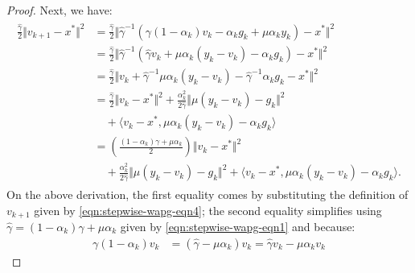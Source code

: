 \documentclass[12pt]{article}
\begin{document}
\begin{proof}
        Next, we have: 
        \begin{align}
        \label{eqn:stepwise-lya-proof-eqn2}
        \begin{split}
            \frac{\hat \gamma}{2}\Vert v_{k + 1} - x^* \Vert^2
            &= 
            \frac{\hat \gamma}{2}\Vert 
                \hat \gamma^{-1}
                (
                    \gamma(1 - \alpha_k)v_k - 
                    \alpha_k g_k + \mu \alpha_k y_k
                )
                - x^* 
            \Vert^2
            \\
            &=  
            \frac{\hat \gamma}{2}
            \Vert 
                \hat \gamma^{-1}
                (
                \hat \gamma v_k + \mu \alpha_k(y_k - v_k)
                    - \alpha_k g_k
                )
                - x^* 
            \Vert^2
            \\
            &= 
            \frac{\hat \gamma}{2}
            \Vert 
                v_k + \hat \gamma^{-1} \mu \alpha_k (y_k - v_k)
                - \hat \gamma^{-1}\alpha_k g_k
                - x^* 
            \Vert^2
            \\
            &= 
            \frac{\hat \gamma}{2}
            \Vert v_k - x^*\Vert^2 
            + 
            \frac{\alpha_k^2}{2\hat \gamma}\Vert \mu(y_k - v_k) - g_k\Vert^2 
            \\ &\quad 
                + 
                \langle v_k - x^*, \mu \alpha_k(y_k - v_k) - \alpha_k g_k\rangle
            \\
            &= 
            \left(
            \frac{(1 - \alpha_k)\gamma + \mu \alpha_k}{2} 
            \right)\Vert v_k - x^*\Vert^2
            \\ &\quad
                + 
                \frac{\alpha_k^2}{2\hat \gamma}
                \Vert \mu(y_k - v_k) - g_k\Vert^2 
                + 
                \langle v_k - x^*, \mu \alpha_k(y_k - v_k) - \alpha_k g_k\rangle. 
        \end{split}
        \end{align}
        On the above derivation, the first equality comes by substituting the definition of $v_{k + 1}$ given by \eqref{eqn:stepwise-wapg-eqn4}; the second equality simplifies using $\hat \gamma = (1 - \alpha_k)\gamma + \mu \alpha_k$ given by \eqref{eqn:stepwise-wapg-eqn1} and  because:
        \begin{align*}
            \gamma(1 - \alpha_k) v_k &= 
            (\hat \gamma  - \mu \alpha_k)v_k
            = \hat \gamma v_k - \mu\alpha_k v_k

\end{align*}
\end{proof}
\end{document}
